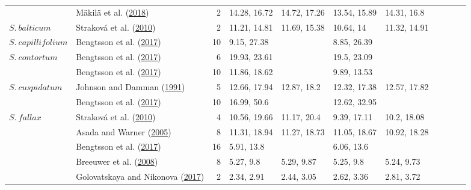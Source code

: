 \documentclass[
  12pt,
]{article}
\begin{document}
\begin{table}[H]
{\begin{tabular}[t]{llrllllllll}
 & Mäkilä et al. (\protect\hyperlink{ref-Makila.2018}{2018}) & 2 & 14.28, 16.72 & 14.72, 17.26 & 13.54, 15.89 & 14.31, 16.8 &  &  &  & \\

\multirow[t]{-4}{*}{\raggedright\arraybackslash $S.~balticum$} & Straková et al. (\protect\hyperlink{ref-Strakova.2010}{2010}) & 2 & 11.21, 14.81 & 11.69, 15.38 & 10.64, 14 & 11.32, 14.91 &  &  &  & \\
\cmidrule{1-11}
$S.~capillifolium$ & Bengtsson et al. (\protect\hyperlink{ref-Bengtsson.2017}{2017}) & 10 & 9.15, 27.38 &  & 8.85, 26.39 &  &  &  &  & \\
\cmidrule{1-11}
$S.~contortum$ & Bengtsson et al. (\protect\hyperlink{ref-Bengtsson.2017}{2017}) & 6 & 19.93, 23.61 &  & 19.5, 23.09 &  &  &  &  & \\
\cmidrule{1-11}
 & Bengtsson et al. (\protect\hyperlink{ref-Bengtsson.2017}{2017}) & 10 & 11.86, 18.62 &  & 9.89, 13.53 &  &  &  &  & \\

\multirow[t]{-2}{*}{\raggedright\arraybackslash $S.~cuspidatum$} & Johnson and Damman (\protect\hyperlink{ref-Johnson.1991}{1991}) & 5 & 12.66, 17.94 & 12.87, 18.2 & 12.32, 17.38 & 12.57, 17.82 &  &  &  & \\
\cmidrule{1-11}
 & Bengtsson et al. (\protect\hyperlink{ref-Bengtsson.2017}{2017}) & 10 & 16.99, 50.6 &  & 12.62, 32.95 &  &  &  &  & \\

\multirow[t]{-2}{*}{\raggedright\arraybackslash $S.~fallax$} & Straková et al. (\protect\hyperlink{ref-Strakova.2010}{2010}) & 4 & 10.56, 19.66 & 11.17, 20.4 & 9.39, 17.11 & 10.2, 18.08 &  &  &  & \\
\cmidrule{1-11}
 & Asada and Warner (\protect\hyperlink{ref-Asada.2005b}{2005}) & 8 & 11.31, 18.94 & 11.27, 18.73 & 11.05, 18.67 & 10.92, 18.28 &  &  &  & \\

 & Bengtsson et al. (\protect\hyperlink{ref-Bengtsson.2017}{2017}) & 16 & 5.91, 13.8 &  & 6.06, 13.6 &  &  &  &  & \\

 & Breeuwer et al. (\protect\hyperlink{ref-Breeuwer.2008}{2008}) & 8 & 5.27, 9.8 & 5.29, 9.87 & 5.25, 9.8 & 5.24, 9.73 &  &  &  & \\

 & Golovatskaya and Nikonova (\protect\hyperlink{ref-Golovatskaya.2017}{2017}) & 2 & 2.34, 2.91 & 2.44, 3.05 & 2.62, 3.36 & 2.81, 3.72 &  &  &  & \\


\end{tabular}}
\end{table}
\end{document}
